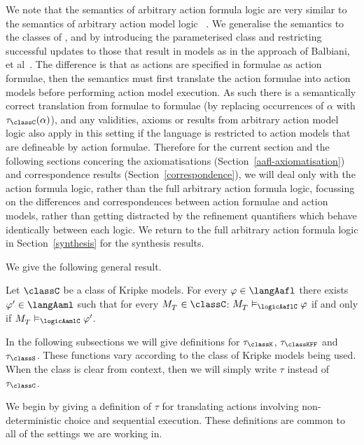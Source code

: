 We note that the semantics of arbitrary action formula logic \logicAaflC{} are very similar to the semantics of arbitrary action model logic \logicAamlC{}~\cite{hales:2013}.
We generalise the semantics to the classes of \classK{}, \classKFF{} and \classS{} by introducing the parameterised class \classC{} and restricting successful updates to those that result in \classC{} models as in the approach of Balbiani, et al~\cite{balbiani:2012}.
The difference is that as actions are specified in \langAafl{} formulae as action formulae, then the semantics must first translate the action formulae into action models before performing action model execution.
As such there is a semantically correct translation from \langAafl{} formulae to \langAaml{} formulae (by replacing occurrences of $\alpha$ with $\tau_\classC(\alpha)$), and any validities, axioms or results from arbitrary action model logic also apply in this setting if the language is restricted to action models that are defineable by action formulae.
Therefore for the current section and the following sections concering the axiomatisations (Section~\ref{aafl-axiomatisation}) and correspondence results (Section~\ref{correspondence}), we will deal only with the action formula logic, rather than the full arbitrary action formula logic, focussing on the differences and correspondences between action formulae and action models, rather than getting distracted by the refinement quantifiers which behave identically between each logic.
We return to the full arbitrary action formula logic in Section~\ref{synthesis} for the synthesis results.

We give the following general result.

\begin{proposition}
Let $\classC$ be a class of Kripke models.
For every $\phi \in \langAafl$ there exists $\phi' \in \langAaml$ such that for every $\kPModel{\kStatesT} \in \classC$: $\kPModel{\kStatesT} \entails_\logicAaflC \phi$ if and only if $\kPModel{\kStatesT} \entails_\logicAamlC \phi'$.
\end{proposition}

In the following subsections we will give definitions for $\tau_\classK$, $\tau_\classKFF$ and $\tau_\classS$.
These functions vary according to the class of Kripke models being used. When the class is clear from context, then we will simply write $\tau$ instead of $\tau_\classC$.

We begin by giving a definition of $\tau$ for translating actions involving non-deterministic choice and sequential execution.
These definitions are common to all of the settings we are working in.

